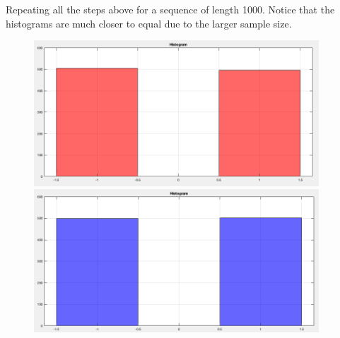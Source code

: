 \documentclass[12pt]{article}
\begin{document}
    \vspace{10pt}
    Repeating all the steps above for a sequence of length 1000. Notice that 
    the histograms are much closer to equal due to the larger sample size.

    \begin{figure}[H]
      \centering
      \begin{minipage}{0.5\textwidth}
        \centering
        \includegraphics[width=0.95\textwidth]{seq1_1000_hist.png}
      \end{minipage}%
      \begin{minipage}{0.5\textwidth}
        \centering
        \includegraphics[width=0.95\textwidth]{seq2_1000_hist.png}
      \end{minipage}
    \end{figure}
\end{document}

